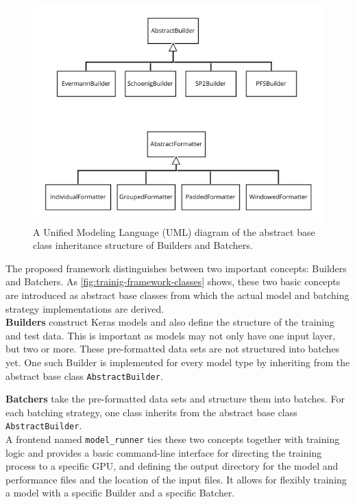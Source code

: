 \begin{figure}
    \centering
    \includegraphics[width=\textwidth]{gfx/training-framework-classes.png}
    \caption{A Unified Modeling Language (UML) diagram of the abstract base class inheritance structure of Builders and Batchers.}
    \label{fig:trainig-framework-classes}
\end{figure}

The proposed framework distinguishes between two important concepts: Builders and Batchers. As \autoref{fig:trainig-framework-classes} shows, these two basic concepts are introduced as abstract base classes from which the actual model and batching strategy implementations are derived.\\

\noindent\textbf{Builders} construct Keras models and also define the structure of the training and test data. This is important as models may not only have one input layer, but two or more. These pre-formatted data sets are not structured into batches yet. One such Builder is implemented for every model type by inheriting from the abstract base class \verb=AbstractBuilder=.

\noindent\textbf{Batchers} take the pre-formatted data sets and structure them into batches. For each batching strategy, one class inherits from the abstract base class \verb=AbstractBuilder=.\\

A frontend named \verb=model_runner= ties these two concepts together with training logic and provides a basic command-line interface for directing the training process to a specific GPU, and defining the output directory for the model and performance files and the location of the input files. It allows for flexibly training a model with a specific Builder and a specific Batcher.\\

